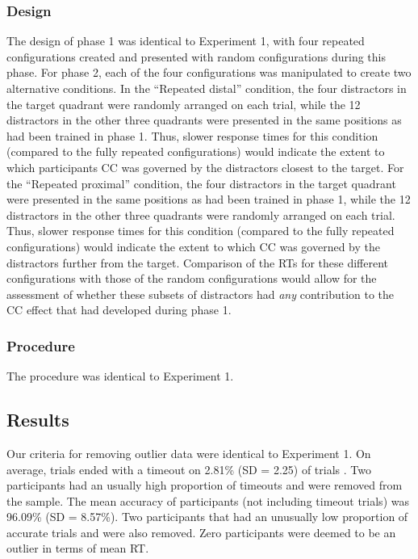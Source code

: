 \documentclass[
  man,floatsintext]{apa7}
\begin{document}
\hypertarget{design-2}{%
\subsubsection{Design}\label{design-2}}

The design of phase 1 was identical to Experiment 1, with four repeated configurations created and presented with random configurations during this phase. For phase 2, each of the four configurations was manipulated to create two alternative conditions. In the ``Repeated distal'' condition, the four distractors in the target quadrant were randomly arranged on each trial, while the 12 distractors in the other three quadrants were presented in the same positions as had been trained in phase 1. Thus, slower response times for this condition (compared to the fully repeated configurations) would indicate the extent to which participants CC was governed by the distractors closest to the target. For the ``Repeated proximal'' condition, the four distractors in the target quadrant were presented in the same positions as had been trained in phase 1, while the 12 distractors in the other three quadrants were randomly arranged on each trial. Thus, slower response times for this condition (compared to the fully repeated configurations) would indicate the extent to which CC was governed by the distractors further from the target. Comparison of the RTs for these different configurations with those of the random configurations would allow for the assessment of whether these subsets of distractors had \emph{any} contribution to the CC effect that had developed during phase 1.

\hypertarget{procedure-2}{%
\subsubsection{Procedure}\label{procedure-2}}

The procedure was identical to Experiment 1.

\hypertarget{results-2}{%
\subsection{Results}\label{results-2}}

Our criteria for removing outlier data were identical to Experiment 1. On average, trials ended with a timeout on 2.81\% (SD = 2.25) of trials . Two participants had an usually high proportion of timeouts and were removed from the sample. The mean accuracy of participants (not including timeout trials) was 96.09\% (SD = 8.57\%). Two participants that had an unusually low proportion of accurate trials and were also removed. Zero participants were deemed to be an outlier in terms of mean RT.
\end{document}
